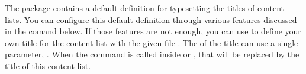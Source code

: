 \begin{Declaration}
\end{Declaration}
The  package contains a default definition for typesetting
the titles of content lists. You can configure this default definition through
various features discussed in the  comand
below. If those features are not enough, you can use 
to define your own title for the content list with the given file
. The  of the title can use a single
parameter, . When the command is called inside
 or ,
that  will be replaced by the title of this content list.%
\EndIndexGroup


